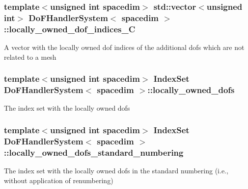 \subsubsection[{\texorpdfstring{locally\+\_\+owned\+\_\+dof\+\_\+indices\+\_\+C}{locally_owned_dof_indices_C}}]{\setlength{\rightskip}{0pt plus 5cm}template$<$unsigned int spacedim$>$ std\+::vector$<$unsigned int$>$ {\bf Do\+F\+Handler\+System}$<$ spacedim $>$\+::locally\+\_\+owned\+\_\+dof\+\_\+indices\+\_\+C\hspace{0.3cm}{\ttfamily [private]}}\hypertarget{class_do_f_handler_system_a7b2e77b2c718b0b13d861da7c0530b28}{}\label{class_do_f_handler_system_a7b2e77b2c718b0b13d861da7c0530b28}
A vector with the locally owned dof indices of the additional dofs which are not related to a mesh 
\subsubsection[{\texorpdfstring{locally\+\_\+owned\+\_\+dofs}{locally_owned_dofs}}]{\setlength{\rightskip}{0pt plus 5cm}template$<$unsigned int spacedim$>$ {\bf Index\+Set} {\bf Do\+F\+Handler\+System}$<$ spacedim $>$\+::locally\+\_\+owned\+\_\+dofs\hspace{0.3cm}{\ttfamily [private]}}\hypertarget{class_do_f_handler_system_ad72a701a3581187eec846c831ba384c5}{}\label{class_do_f_handler_system_ad72a701a3581187eec846c831ba384c5}
The index set with the locally owned dofs 
\subsubsection[{\texorpdfstring{locally\+\_\+owned\+\_\+dofs\+\_\+standard\+\_\+numbering}{locally_owned_dofs_standard_numbering}}]{\setlength{\rightskip}{0pt plus 5cm}template$<$unsigned int spacedim$>$ {\bf Index\+Set} {\bf Do\+F\+Handler\+System}$<$ spacedim $>$\+::locally\+\_\+owned\+\_\+dofs\+\_\+standard\+\_\+numbering\hspace{0.3cm}{\ttfamily [private]}}\hypertarget{class_do_f_handler_system_a257ddb680d9f8276f7b802884dd8e577}{}\label{class_do_f_handler_system_a257ddb680d9f8276f7b802884dd8e577}
The index set with the locally owned dofs in the standard numbering (i.\+e., without application of renumbering) 
